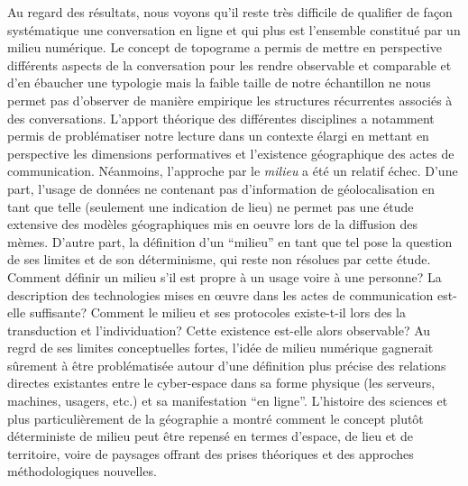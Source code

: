 Au regard des r\'esultats, nous voyons qu{\textquoteright}il reste tr\`es difficile de qualifier de fa\c{c}on syst\'ematique une conversation en ligne et qui plus est l{\textquoteright}ensemble constitu\'e par un milieu num\'erique. Le concept de topograme a permis de mettre en perspective diff\'erents aspects de la conversation pour les rendre observable et comparable et d{\textquoteright}en \'ebaucher une typologie mais la faible taille de notre \'echantillon ne nous permet pas d{\textquoteright}observer de mani\`ere empirique les structures r\'ecurrentes associ\'es \`a des conversations. L{\textquoteright}apport th\'eorique des diff\'erentes disciplines a notamment permis de probl\'ematiser notre lecture dans un contexte \'elargi en mettant en perspective les dimensions performatives et l{\textquoteright}existence g\'eographique des actes de communication. N\'eanmoins, l{\textquoteright}approche par le \textit{milieu} a \'et\'e un relatif \'echec. D{\textquoteright}une part, l{\textquoteright}usage de donn\'ees ne contenant pas d{\textquoteright}information de g\'eolocalisation en tant que telle (seulement une indication de lieu) ne permet pas une \'etude extensive des mod\`eles g\'eographiques mis en oeuvre lors de la diffusion des m\`emes. D{\textquoteright}autre part, la d\'efinition d{\textquoteright}un {\textquotedblleft}milieu{\textquotedblright} en tant que tel pose la question de ses limites et de son d\'eterminisme, qui reste non r\'esolues par cette \'etude. Comment d\'efinir un milieu s{\textquoteright}il est propre \`a un usage voire \`a une personne? La description des technologies mises en {\oe}uvre dans les actes de communication est-elle suffisante? Comment le milieu et ses protocoles existe-t-il lors des la transduction et l{\textquoteright}individuation? Cette existence est-elle alors observable? Au regrd de ses limites conceptuelles fortes, l{\textquoteright}id\'ee de milieu num\'erique gagnerait s\^urement \`a \^etre probl\'ematis\'ee autour d{\textquoteright}une d\'efinition plus pr\'ecise des relations directes existantes entre le cyber-espace dans sa forme physique (les serveurs, machines, usagers, etc.) et sa manifestation {\textquotedblleft}en ligne{\textquotedblright}. L{\textquoteright}histoire des sciences et plus particuli\`erement de la g\'eographie a montr\'e comment le concept plut\^ot d\'eterministe de milieu peut \^etre repens\'e en termes d{\textquoteright}espace, de lieu et de territoire, voire de paysages offrant des prises th\'eoriques et des approches m\'ethodologiques nouvelles.

